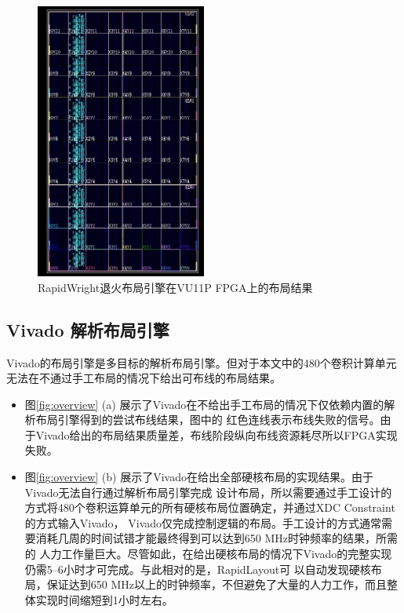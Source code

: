 \begin{figure}[h]
	\centering
	\includegraphics[width=0.5\textwidth]{figure/rapidwright_baseline.png}
	\caption{RapidWright退火布局引擎在VU11P FPGA上的布局结果} 
	\label{fig:rapidwright_baseline}
\end{figure}


\subsection{Vivado 解析布局引擎}

Vivado的布局引擎是多目标的解析布局引擎。但对于本文中的480个卷积计算单元无法在不通过手工布局的情况下给出可布线的布局结果。

\begin{itemize}
    \item 图\ref{fig:overview} (a) 展示了Vivado在不给出手工布局的情况下仅依赖内置的解析布局引擎得到的尝试布线结果，图中的
    红色连线表示布线失败的信号。由于Vivado给出的布局结果质量差，布线阶段纵向布线资源耗尽所以FPGA实现失败。
    
    \item 图\ref{fig:overview} (b) 展示了Vivado在给出全部硬核布局的实现结果。由于Vivado无法自行通过解析布局引擎完成
    设计布局，所以需要通过手工设计的方式将480个卷积运算单元的所有硬核布局位置确定，并通过XDC Constraint的方式输入Vivado，
    Vivado仅完成控制逻辑的布局。手工设计的方式通常需要消耗几周的时间试错才能最终得到可以达到650 MHz时钟频率的结果，所需的
    人力工作量巨大。尽管如此，在给出硬核布局的情况下Vivado的完整实现仍需5--6小时才可完成。与此相对的是，RapidLayout可
    以自动发现硬核布局，保证达到650 MHz以上的时钟频率，不但避免了大量的人力工作，而且整体实现时间缩短到1小时左右。

\end{itemize}

